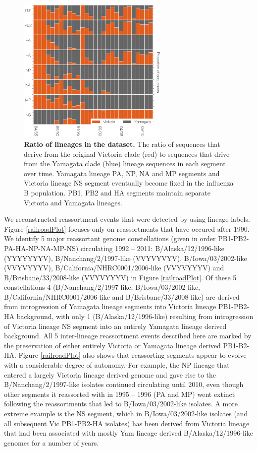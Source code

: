 \documentclass[11pt,oneside,letterpaper]{article}
\begin{document}
\begin{figure}[h]
	\centering	
	\includegraphics[width=0.65\textwidth]	{figures/InfB_LineageRatiosOverTime.png}
	\caption{\textbf{Ratio of lineages in the dataset.}
The ratio of sequences that derive from the original Victoria clade (red) to sequences that drive from the Yamagata clade (blue) lineage sequences in each segment over time.
Yamagata lineage PA, NP, NA and MP segments and Victoria lineage NS segment eventually become fixed in the influenza B population.
PB1, PB2 and HA segments maintain separate Victoria and Yamagata lineages.}
	\label{lineageRatiosOverTime}
\end{figure}

We reconstructed reassortment events that were detected by using lineage labels.
Figure \ref{railroadPlot} focuses only on reassortments that have occured after 1990.
We identify 5 major reassortant genome constellations (given in order PB1-PB2-PA-HA-NP-NA-MP-NS) circulating 1992 -- 2011: B/Alaska/12/1996-like (YYYYYYYV), B/Nanchang/2/1997-like (VVYVYVYV), B/Iowa/03/2002-like (VVYVYYYV), B/California/NHRC0001/2006-like (VVYVYYYV) and B/Brisbane/33/2008-like (VVYVYYYV) in Figure \ref{railroadPlot}.
Of these 5 constellations 4 (B/Nanchang/2/1997-like, B/Iowa/03/2002-like, B/California/NHRC0001/2006-like and B/Brisbane/33/2008-like) are derived from introgression of Yamagata lineage segments into Victoria lineage PB1-PB2-HA background, with only 1 (B/Alaska/12/1996-like) resulting from introgression of Victoria lineage NS segment into an entirely Yamagata lineage derived background.
All 5 inter-lineage reassortment events described here are marked by the preservation of either entirely Victoria or Yamagata lineage derived PB1-B2-HA.
Figure \ref{railroadPlot} also shows that reassorting segments appear to evolve with a considerable degree of autonomy.
For example, the NP lineage that entered a largely Victoria lineage derived genome and gave rise to the B/Nanchang/2/1997-like isolates continued circulating until 2010, even though other segments it reassorted with in 1995 -- 1996 (PA and MP) went extinct following the reassortments that led to B/Iowa/03/2002-like isolates.
A more extreme example is the NS segment, which in B/Iowa/03/2002-like isolates (and all subsequent Vic PB1-PB2-HA isolates) has been derived from Victoria lineage that had been associated with mostly Yam lineage derived B/Alaska/12/1996-like genomes for a number of years.
\end{document}
